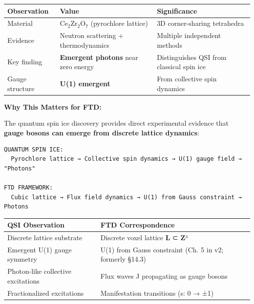 \documentclass[
  11pt,
  letterpaper,
  twoside,
  openright]{book}
\begin{document}
\begin{longtable}[]{@{}
  >{\raggedright\arraybackslash}p{}
  >{\raggedright\arraybackslash}p{}
  >{\raggedright\arraybackslash}p{}@{}}
\toprule\noalign{}
\begin{minipage}[b]{\linewidth}\raggedright
Observation
\end{minipage} & \begin{minipage}[b]{\linewidth}\raggedright
Value
\end{minipage} & \begin{minipage}[b]{\linewidth}\raggedright
Significance
\end{minipage} \\
\midrule\noalign{}
\endhead
\bottomrule\noalign{}
\endlastfoot
Material & \(\text{Ce}_2\text{Zr}_2\text{O}_7\) (pyrochlore lattice) &
3D corner-sharing tetrahedra \\
Evidence & Neutron scattering + thermodynamics & Multiple independent
methods \\
Key finding & \textbf{Emergent photons} near zero energy & Distinguishes
QSI from classical spin ice \\
Gauge structure & \textbf{U(1) emergent} & From collective spin
dynamics \\
\end{longtable}

\textbf{Why This Matters for FTD:}

The quantum spin ice discovery provides direct experimental evidence
that \textbf{gauge bosons can emerge from discrete lattice dynamics}:

\begin{verbatim}
QUANTUM SPIN ICE:
  Pyrochlore lattice → Collective spin dynamics → U(1) gauge field → "Photons"

FTD FRAMEWORK:
  Cubic lattice → Flux field dynamics → U(1) from Gauss constraint → Photons
\end{verbatim}

\begin{longtable}[]{@{}
  >{\raggedright\arraybackslash}p{}
  >{\raggedright\arraybackslash}p{}@{}}
\toprule\noalign{}
\begin{minipage}[b]{\linewidth}\raggedright
QSI Observation
\end{minipage} & \begin{minipage}[b]{\linewidth}\raggedright
FTD Correspondence
\end{minipage} \\
\midrule\noalign{}
\endhead
\bottomrule\noalign{}
\endlastfoot
Discrete lattice substrate & Discrete voxel lattice \textbf{L} ⊂
\textbf{Z}³ \\
Emergent U(1) gauge symmetry & U(1) from Gauss constraint (Ch. 5 in v2;
formerly §14.3) \\
Photon-like collective excitations & Flux waves J propagating as gauge
bosons \\
Fractionalized excitations & Manifestation transitions (s: 0 → ±1) \\
\end{longtable}
\end{document}
